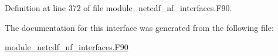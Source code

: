 Definition at line 372 of file module\+\_\+netcdf\+\_\+nf\+\_\+interfaces.\+F90.



The documentation for this interface was generated from the following file\+:\begin{DoxyCompactItemize}
\item 
\hyperlink{module__netcdf__nf__interfaces_8F90}{module\+\_\+netcdf\+\_\+nf\+\_\+interfaces.\+F90}\end{DoxyCompactItemize}
